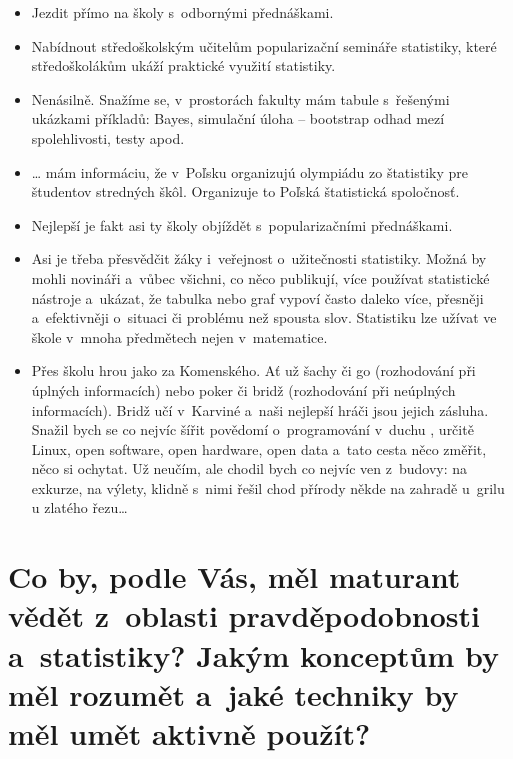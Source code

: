 \begin{itemize}
\item Jezdit přímo na školy s~odbornými přednáškami.
\item Nabídnout středoškolským učitelům popularizační semináře statistiky, které středoškolákům ukáží praktické využití statistiky.
\item Nenásilně. Snažíme se, v~prostorách fakulty mám tabule s~řešenými ukázkami příkladů: Bayes, simulační úloha -- bootstrap odhad mezí spolehlivosti, testy apod.
\item … mám informáciu, že v~Poľsku organizujú olympiádu zo štatistiky pre študentov stredných škôl. Organizuje to Poľská štatistická spoločnosť.
\item Nejlepší je fakt asi ty školy objíždět s~popularizačními přednáškami.
\item Asi je třeba přesvědčit žáky i~veřejnost o~užitečnosti statistiky. Možná by mohli novináři a~vůbec všichni, co něco publikují, více používat statistické nástroje a~ukázat, že tabulka nebo graf vypoví často daleko více, přesněji a~efektivněji o~situaci či problému než spousta slov. Statistiku lze užívat ve škole v~mnoha předmětech nejen v~matematice. 
\item Přes školu hrou jako za Komenského. Ať už šachy či go (rozhodování při úplných informacích) nebo poker či bridž (rozhodování při neúplných informacích). Bridž učí v~Karviné a~naši nejlepší hráči jsou jejich zásluha. Snažil bych se co nejvíc šířit povědomí o~programování v~duchu , určitě Linux, open software, open hardware, open data a~tato cesta něco změřit, něco si ochytat. Už neučím, ale chodil bych co nejvíc ven z~budovy: na exkurze, na výlety, klidně s~nimi řešil chod přírody někde na zahradě u~grilu u zlatého řezu\ldots
\end{itemize}



\section{Co by, podle Vás, měl maturant vědět z~oblasti pravděpodobnosti a~statistiky? Jakým konceptům by měl rozumět a~jaké techniky by měl umět aktivně použít?}
\smallskip

